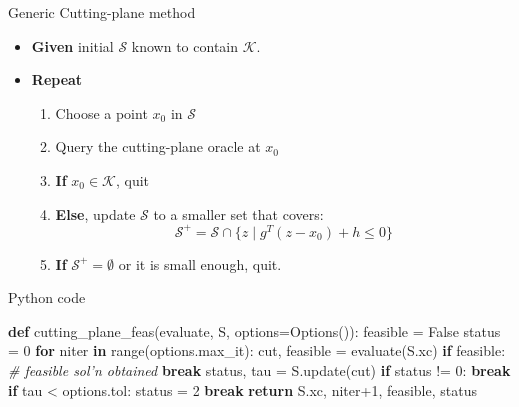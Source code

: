\documentclass[10pt,ignorenonframetext,serif,onlymath]{beamer}
\newenvironment{Shaded}{}{}
\newcommand{\BuiltInTok}[1]{#1}
\newcommand{\CommentTok}[1]{\textcolor[rgb]{0.38,0.63,0.69}{\textit{#1}}}
\newcommand{\ControlFlowTok}[1]{\textcolor[rgb]{0.00,0.44,0.13}{\textbf{#1}}}
\newcommand{\DecValTok}[1]{\textcolor[rgb]{0.25,0.63,0.44}{#1}}
\newcommand{\KeywordTok}[1]{\textcolor[rgb]{0.00,0.44,0.13}{\textbf{#1}}}
\newcommand{\NormalTok}[1]{#1}
\newcommand{\OperatorTok}[1]{\textcolor[rgb]{0.40,0.40,0.40}{#1}}
\newcommand{\VariableTok}[1]{\textcolor[rgb]{0.10,0.09,0.49}{#1}}
\providecommand{\tightlist}{%
  \setlength{\itemsep}{0pt}\setlength{\parskip}{0pt}}
\begin{document}
\begin{frame}{Generic Cutting-plane method}
\protect\hypertarget{sec:generic-cutting-plane-method}{}

\begin{itemize}
\tightlist
\item
  \textbf{Given} initial \(\mathcal{S}\) known to contain
  \(\mathcal{K}\).
\item
  \textbf{Repeat}

  \begin{enumerate}
  [1.]
  \tightlist
  \item
    Choose a point \(x_0\) in \(\mathcal{S}\)
  \item
    Query the cutting-plane oracle at \(x_0\)
  \item
    \textbf{If} \(x_0 \in \mathcal{K}\), quit
  \item
    \textbf{Else}, update \(\mathcal{S}\) to a smaller set that covers:
    \[\mathcal{S}^+ = \mathcal{S} \cap \{z \mid g^T (z - x_0) + h \leq 0\}\]
  \item
    \textbf{If} \(\mathcal{S}^+ = \emptyset\) or it is small enough,
    quit.
  \end{enumerate}
\end{itemize}

\end{frame}

\begin{frame}[fragile]{Python code}
\protect\hypertarget{sec:python-code}{}

\begin{Shaded}
\begin{Highlighting}[]
\KeywordTok{def}\NormalTok{ cutting_plane_feas(evaluate, S, options}\OperatorTok{=}\NormalTok{Options()):}
\NormalTok{    feasible }\OperatorTok{=} \VariableTok{False}
\NormalTok{    status }\OperatorTok{=} \DecValTok{0}
    \ControlFlowTok{for}\NormalTok{ niter }\KeywordTok{in} \BuiltInTok{range}\NormalTok{(options.max_it):}
\NormalTok{        cut, feasible }\OperatorTok{=}\NormalTok{ evaluate(S.xc)}
        \ControlFlowTok{if}\NormalTok{ feasible:  }\CommentTok{# feasible sol'n obtained}
            \ControlFlowTok{break}
\NormalTok{        status, tau }\OperatorTok{=}\NormalTok{ S.update(cut)}
        \ControlFlowTok{if}\NormalTok{ status }\OperatorTok{!=} \DecValTok{0}\NormalTok{:}
            \ControlFlowTok{break}
        \ControlFlowTok{if}\NormalTok{ tau }\OperatorTok{<}\NormalTok{ options.tol:}
\NormalTok{            status }\OperatorTok{=} \DecValTok{2}
            \ControlFlowTok{break}
    \ControlFlowTok{return}\NormalTok{ S.xc, niter}\OperatorTok{+}\DecValTok{1}\NormalTok{, feasible, status}
\end{Highlighting}
\end{Shaded}

\end{frame}
\end{document}
